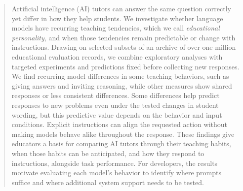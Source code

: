 \begin{abstract}
Artificial intelligence (AI) tutors can answer the same question correctly yet differ in how they help
students. We investigate whether language models have recurring teaching
tendencies, which we call \emph{educational personality}, and when those
tendencies remain predictable or change with instructions. Drawing on selected
subsets of an archive of over one million educational evaluation records,
we combine exploratory analyses with targeted experiments and predictions
fixed before collecting new responses. We find recurring model differences
in some teaching behaviors, such as giving answers and inviting reasoning,
while other measures show shared responses or less consistent differences.
Some differences help predict responses to new problems even under the tested
changes in student wording, but this predictive value depends on the behavior
and input conditions. Explicit instructions can align the requested action
without making models behave alike throughout the response. These findings
give educators a basis for comparing AI tutors through their teaching habits,
when those habits can be anticipated, and how they respond to instructions,
alongside task performance. For developers, the results motivate evaluating each
model's behavior to identify where prompts suffice and where additional
system support needs to be tested.
\end{abstract}
